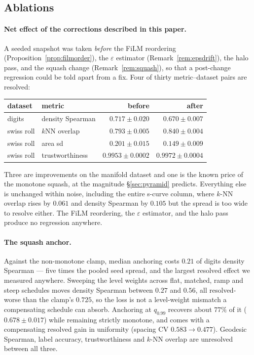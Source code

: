 \documentclass[12pt]{iopart}
\theoremstyle{definition}
\theoremstyle{plain}
\theoremstyle{remark}
\begin{document}
\subsection{Ablations}
\label{sec:ablations}

\paragraph{Net effect of the corrections described in this paper.}
A seeded snapshot was taken \emph{before} the FiLM reordering
(Proposition~\ref{prop:filmorder}), the $\varepsilon$ estimator
(Remark~\ref{rem:epsdrift}), the halo pass, and the squash change
(Remark~\ref{rem:squash}), so that a post-change regression could be told apart
from a fix. Four of thirty metric--dataset pairs are resolved:

\begin{center}
\small
\begin{tabular}{llrr}
\toprule
dataset & metric & before & after \\
\midrule
digits     & density Spearman & $0.717\pm0.020$ & $0.670\pm0.007$ \\
swiss roll & $k$NN overlap    & $0.793\pm0.005$ & $0.840\pm0.004$ \\
swiss roll & area sd          & $0.201\pm0.015$ & $0.149\pm0.009$ \\
swiss roll & trustworthiness  & $0.9953\pm0.0002$ & $0.9972\pm0.0004$ \\
\bottomrule
\end{tabular}
\end{center}

Three are improvements on the manifold dataset and one is the known price of the
monotone squash, at the magnitude \S\ref{sec:pyramid} predicts. Everything else
is unchanged within noise, including the entire s-curve column, where $k$-NN
overlap rises by $0.061$ and density Spearman by $0.105$ but the spread is too
wide to resolve either. The FiLM reordering, the $\varepsilon$ estimator, and
the halo pass produce no regression anywhere.

\paragraph{The squash anchor.}
Against the non-monotone clamp, median anchoring costs $0.21$ of digits density
Spearman --- five times the pooled seed spread, and the largest resolved effect
we measured anywhere. Sweeping the level weights across flat, matched, ramp and
steep schedules moves density Spearman between $0.27$ and $0.56$, all
resolved-worse than the clamp's $0.725$, so the loss is not a level-weight
mismatch a compensating schedule can absorb. Anchoring at $q_{0.99}$ recovers
about $77\%$ of it ($0.678\pm0.017$) while remaining strictly monotone, and
comes with a compensating resolved gain in uniformity (spacing CV $0.583\to
0.477$). Geodesic Spearman, label accuracy, trustworthiness and $k$-NN overlap
are unresolved between all three.
\end{document}
